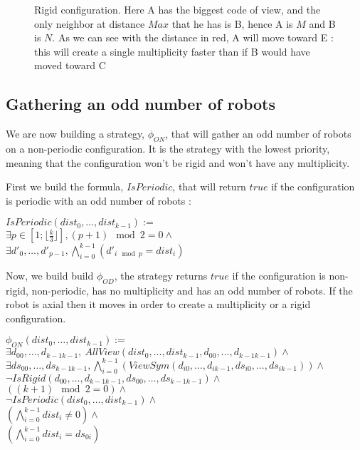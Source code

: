 \documentclass{article}
\begin{document}
\begin{figure}
    \centering
    \def\svgscale{0.3}
    
    \caption{Rigid configuration. Here A has the biggest code of view, and the only neighbor at distance $Max$ that he has is B, hence A is $M$ and B is $N$. As we can see with the distance in red, A will move toward E : this will create a single multiplicity faster than if B would have moved toward C}
    \label{dessinRigid}
\end{figure}

\subsection{Gathering an odd number of robots}

We are now building a strategy, $\phi_{ON}$, that will gather an odd number of robots on a non-periodic configuration. It is the strategy with the lowest priority, meaning that the configuration won't be rigid and won't have any multiplicity.

First we build the formula, $IsPeriodic$, that will return $true$ if the configuration is periodic with an odd number of robots :

\begin{center}
    
$IsPeriodic(dist_{0}, \ldots , dist_{k-1}):=$\\
$\exists p \in [1; \lfloor \frac{k}{3} \rfloor ], (p+1) \mod{2} = 0 \land $\\
$\exists d'_{0}, \ldots , d'_{p-1}, \bigwedge_{i=0}^{k-1} (d'_{i\mod{p}} = dist_{i})$
\end{center}

Now, we build build $\phi_{OD}$, the strategy returns $true$ if the configuration is non-rigid, non-periodic, has no multiplicity and has an odd number of robots. If the robot is axial then it moves in order to create a multiplicity or a rigid configuration.

\begin{center}
    
$\phi_{ON}(dist_{0}, \ldots , dist_{k-1}):=$\\
$\exists d_{00}, \ldots ,d_{k-1k-1},\ AllView(dist_{0}, \ldots ,dist_{k-1}, d_{00}, \ldots ,d_{k-1k-1})\land$\\
$\exists ds_{00}, \ldots ,ds_{k-1k-1}, \bigwedge_{i=0}^{k-1} (ViewSym(d_{i0}, \ldots , d_{ik-1}, ds_{i0}, \ldots , ds_{ik-1}))\land$\\
$\lnot IsRigid(d_{00}, \ldots ,d_{k-1k-1}, ds_{00}, \ldots ,ds_{k-1k-1}) \land $\\
$((k+1) \mod{2} = 0) \land $\\
$\lnot IsPeriodic(dist_{0}, \ldots , dist_{k-1}) \land $\\
$(\bigwedge_{i=0}^{k-1} dist_{i} \not= 0) \land $\\
$(\bigwedge_{i=0}^{k-1} dist_{i} = ds_{0i})$
\end{center}
\end{document}
